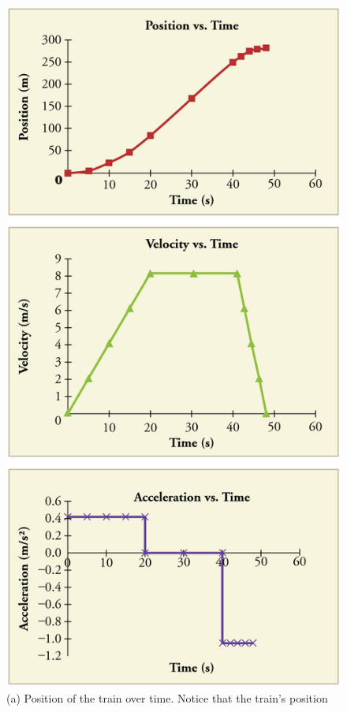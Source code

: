 \documentclass[
]{book}
\begin{document}
\begin{figure}
\hypertarget{import-auto-id2596938}{%
\centering
\includegraphics{images/Figure_02_03_04.jpg}
\caption{(a) Position of the train over time. Notice that the train's position
}}
\end{figure}
\end{document}
